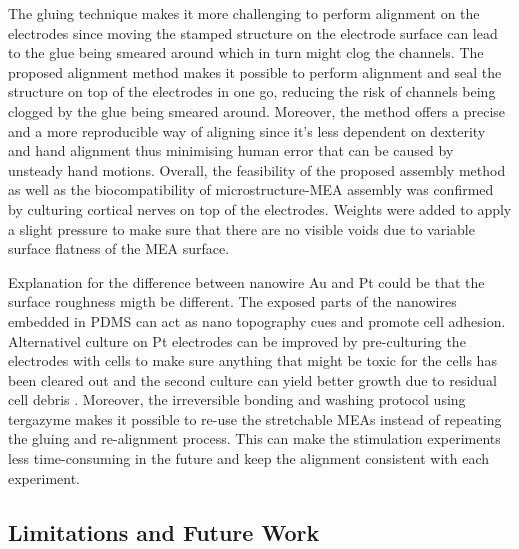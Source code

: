 \quad The gluing technique makes it more challenging to perform alignment on the electrodes since moving the stamped structure on the electrode surface can lead to the glue being smeared around which in turn might clog the channels. The proposed alignment method makes it possible to perform alignment and seal the structure on top of the electrodes in one go, reducing the risk of channels being clogged by the glue being smeared around. Moreover, the method offers a precise and a more reproducible way of aligning since it's less dependent on dexterity and hand alignment thus minimising human error that can be caused by unsteady hand motions. Overall, the feasibility of the proposed assembly method as well as the biocompatibility of microstructure-MEA assembly was confirmed by culturing cortical nerves on top of the electrodes. Weights were added to apply a slight pressure to make sure that there are no visible voids due to variable surface flatness of the MEA surface.

\quad Explanation for the difference between nanowire Au and Pt could be that the surface roughness migth be different. The exposed parts of the nanowires embedded in PDMS can act as nano topography cues and promote cell adhesion. Alternativel culture on Pt electrodes can be improved by pre-culturing the electrodes with cells to make sure anything that might be toxic for the cells has been cleared out and the second culture can yield better growth due to residual cell debris \cite{hong2017chip}. Moreover, the irreversible bonding and washing protocol using tergazyme makes it possible to re-use the stretchable MEAs instead of repeating the gluing and re-alignment process. This can make the stimulation experiments less time-consuming in the future and keep the alignment consistent with each experiment.

\subsection{Limitations and Future Work}

